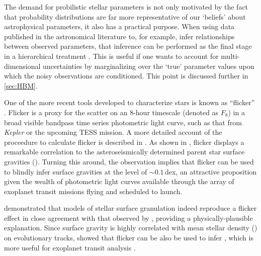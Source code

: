The demand for probilistic stellar parameters is not only motivated by the fact
that probability distributions are far more representative of our `beliefs'
about astrophysical parameters, it also has a practical purpose.
When using data published in the astronomical literature to, for example, infer
relationships between observed parameters, that inference can be performed as
the final stage in a hierarchical treatment
\citep[see, e.g.][]{forman-mackey:2014}.
This is useful if one wants to account for multi-dimensional uncertainties by
marginalizing over the `true' parameter values upon which the noisy
observations are conditioned.
This point is discussed further in \textsection\ref{sec:HBM}.



One of the more recent tools developed to characterize stars is known as
``flicker'' \citep{bastien:2013}.
Flicker is a proxy for the scatter on an 8-hour timescale (denoted as $F_8$)
in a broad visible bandpass time series photometric light curve, such as that
from \textit{Kepler} or the upcoming TESS mission. A more detailed account of
the proceedure to calculate flicker is described in \citet{bastien:2013}. As
shown in \citet{bastien:2013}, flicker displays a remarkable correlation to
the asteroseismically determined parent star surface gravities (\logg).
Turning this around, the observation implies that flicker can be used to
blindly infer surface gravities at the level of $\sim0.1$\,dex, an attractive
proposition given the wealth of photometric light curves available through the
array of exoplanet transit missions flying and scheduled to launch.

\citet{cranmer:2014} demonstrated that models of stellar surface granulation
indeed reproduce a flicker effect in close agreement with that observed by
\citet{bastien:2013}, providing a physically-plausible explanation.
Since surface gravity is highly correlated with mean stellar density (\rhostar)
on evolutionary tracks, \citet{kipping:2014} showed that flicker can be also
be used to infer \rhostar, which is more useful for exoplanet transit analysis
\citep{seager:2003}.

